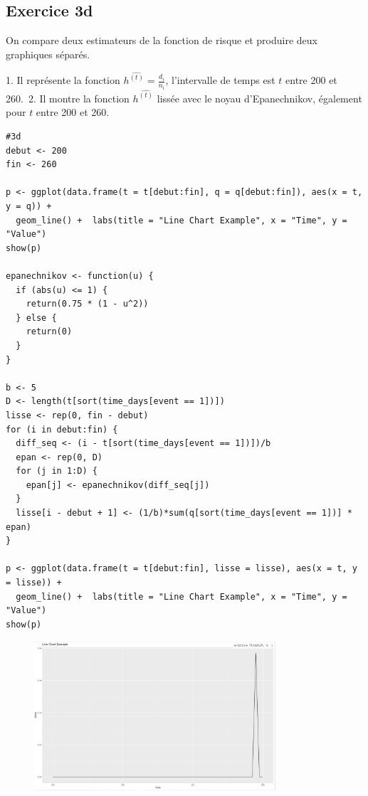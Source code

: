 \documentclass[../main.tex]{subfiles}
\begin{document}
\begin{CJK*}{UTF8}{gbsn}

\section*{Exercice 3d}
On compare deux estimateurs de la fonction de risque et produire deux graphiques séparés.
\begin{enumerate}
1. Il représente la fonction $h^\hat{(t)} = \frac{d_i}{n_i}$, l'intervalle de temps est $t$ entre 200 et 260.\
2. Il montre la fonction $h^\hat{(t)}$ lissée avec le noyau d'Epanechnikov, également pour $t$ entre 200 et 260.
\end{enumerate}



\begin{lstlisting}
#3d
debut <- 200
fin <- 260

p <- ggplot(data.frame(t = t[debut:fin], q = q[debut:fin]), aes(x = t, y = q)) +
  geom_line() +  labs(title = "Line Chart Example", x = "Time", y = "Value")
show(p)

epanechnikov <- function(u) {
  if (abs(u) <= 1) {
    return(0.75 * (1 - u^2))
  } else {
    return(0)
  }
}

b <- 5
D <- length(t[sort(time_days[event == 1])])
lisse <- rep(0, fin - debut)
for (i in debut:fin) {
  diff_seq <- (i - t[sort(time_days[event == 1])])/b
  epan <- rep(0, D)
  for (j in 1:D) {
    epan[j] <- epanechnikov(diff_seq[j])
  }
  lisse[i - debut + 1] <- (1/b)*sum(q[sort(time_days[event == 1])] * epan)
}

p <- ggplot(data.frame(t = t[debut:fin], lisse = lisse), aes(x = t, y = lisse)) +
  geom_line() +  labs(title = "Line Chart Example", x = "Time", y = "Value")
show(p)

\end{lstlisting}

\begin{figure}[H]
  \centering
  \includegraphics[width=0.8\textwidth]{3D2.JPG}
  \label{fig:mesh1}
\end{figure}


\end{CJK*}
\end{document}
